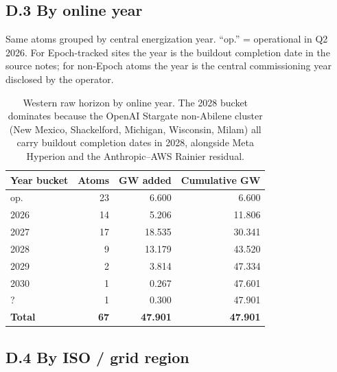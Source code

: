 \subsection*{D.3 \quad By online year}

\noindent Same atoms grouped by central energization year. ``op.'' = operational in Q2 2026. For Epoch-tracked sites the year is the buildout completion date in the source notes; for non-Epoch atoms the year is the central commissioning year disclosed by the operator.
\begin{table}[H]
\centering\small
\begin{tabular}{@{}lrrr@{}}
\toprule
\textbf{Year bucket} & \textbf{Atoms} & \textbf{GW added} & \textbf{Cumulative GW} \\
\midrule

op. & 23 & 6.600 & 6.600 \\

2026 & 14 & 5.206 & 11.806 \\

2027 & 17 & 18.535 & 30.341 \\

2028 & 9 & 13.179 & 43.520 \\

2029 & 2 & 3.814 & 47.334 \\

2030 & 1 & 0.267 & 47.601 \\

? & 1 & 0.300 & 47.901 \\

\midrule\textbf{Total} & \textbf{67} & \textbf{47.901} & \textbf{47.901} \\

\bottomrule
\end{tabular}
\caption{Western raw horizon by online year. The 2028 bucket dominates because the OpenAI Stargate non-Abilene cluster (New Mexico, Shackelford, Michigan, Wisconsin, Milam) all carry buildout completion dates in 2028, alongside Meta Hyperion and the Anthropic--AWS Rainier residual.}
\end{table}


\subsection*{D.4 \quad By ISO / grid region}

